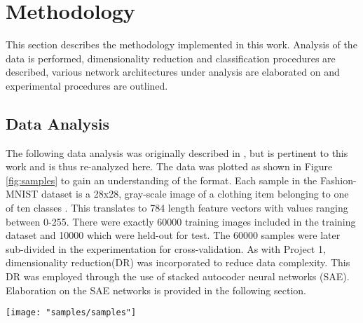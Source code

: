 \documentclass[conference]{IEEEtran}
\begin{document}
\section{Methodology} \label{Methodology}
	This section describes the methodology implemented in this work.  Analysis of the data is performed, dimensionality reduction and classification procedures are described, various network architectures under analysis are elaborated on and experimental procedures are outlined.

	\subsection{Data Analysis}
	 The following data analysis was originally described in \cite{McCurley2019PrincipeProject1}, but is pertinent to this work and is thus re-analyzed here.  The data was plotted as shown in Figure \ref{fig:samples} to gain an understanding of the format.  Each sample in the Fashion-MNIST dataset is a 28x28, gray-scale image of a clothing item belonging to one of ten classes \cite{Xiao2017FashionMNIST}. This translates to 784 length feature vectors with values ranging between 0-255. There were exactly 60000 training images included in the  training dataset and 10000 which were held-out for test.  The 60000 samples were later sub-divided in the experimentation for cross-validation.  As with Project 1, dimensionality reduction(DR) was incorporated to reduce data complexity.  This DR was employed through the use of stacked autocoder neural networks (SAE).  Elaboration on the SAE networks is provided in the following section.
	
	 \begin{center}
	 	\begin{figure*}[h]
	 		\centering
	 		\texttt{[image: "samples/samples"]}
	 		\caption{Samples from the Fashion-MNIST dataset. One sample from each class was randomly chosen for visualization.  The gray-scale images are size 28x28, each representing an article of clothing.}
	 		\label{fig:samples}
	 	\end{figure*}
	 \end{center}
\end{document}
